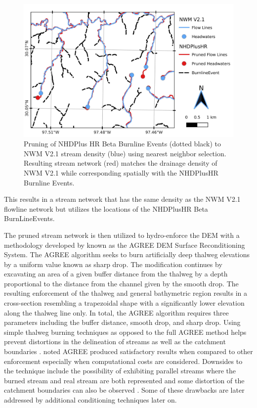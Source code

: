 \begin{figure}[h!]
\centering
\includegraphics[scale=1.0]{figures/headwaters.jpg}
\caption{Pruning of NHDPlus HR Beta Burnline Events (dotted black) to NWM V2.1 stream density (blue) using nearest neighbor selection. Resulting stream network (red) matches the drainage density of NWM V2.1 while corresponding spatially with the NHDPlusHR Burnline Events.}
\label{fig:stream_density_pruning}
\end{figure}
%
This results in a stream network that has the same density as the NWM V2.1 flowline network but utilizes the locations of the NHDPlusHR Beta BurnLineEvents. 

The pruned stream network is then utilized to hydro-enforce the DEM with a methodology developed by  known as the AGREE DEM Surface Reconditioning System. 
The AGREE algorithm seeks to burn artificially deep thalweg elevations by a uniform value known as sharp drop. 
The modification continues by excavating an area of a given buffer distance from the thalweg by a depth proportional to the distance from the channel given by the smooth drop. 
The resulting enforcement of the thalweg and general bathymetric region results in a cross-section resembling a trapezoidal shape with a significantly lower elevation along the thalweg line only.
In total, the AGREE algorithm requires three parameters including the buffer distance, smooth drop, and sharp drop. 
Using simple thalweg burning techniques as opposed to the full AGREE method helps prevent distortions in the delineation of streams as well as the catchment boundaries \cite{saunders1995grid,saunders1996gis,mizgalewicz1996modeling,hellweger1997agree,quenzer1998gis,baker2006comparison}.
 noted AGREE produced satisfactory results when compared to other enforcement especially when computational costs are considered. 
Downsides to the technique include the possibility of exhibiting parallel streams where the burned stream and real stream are both represented \cite{hellweger1997agree,saunders1999preparation} and some distortion of the catchment boundaries can also be observed \cite{saunders1999preparation,saunders1996gis}. Some of these drawbacks are later addressed by additional conditioning techniques later on.
%
